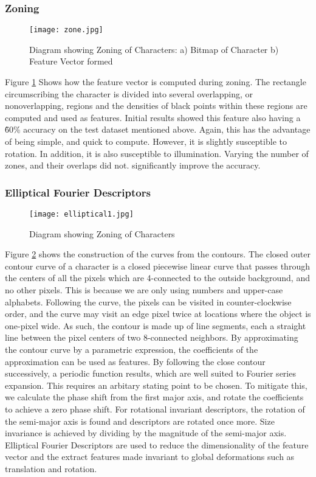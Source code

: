 \subsubsection{Zoning}
\begin{figure}[!]
		\texttt{[image: zone.jpg]}\\
		\caption{Diagram showing Zoning of Characters: a) Bitmap of Character b) Feature Vector formed}
		\label{fig:zone}
\end{figure}
Figure \ref{fig:zone} Shows how the feature vector is computed during zoning. The rectangle circumscribing the character 
is divided into several overlapping, or nonoverlapping, regions and the densities of black points within these regions are computed
and used as features. Initial results showed this feature also having a \~60\% accuracy on the test dataset mentioned above. Again, this has the advantage of being simple, and
quick to compute. However, it is slightly susceptible to rotation.
In addition, it is also susceptible to illumination. Varying the number of zones, and their overlaps did not. significantly improve the accuracy.\\


\subsubsection{Elliptical Fourier Descriptors}
\begin{figure}[h]
		\texttt{[image: elliptical1.jpg]}\\
		\caption{Diagram showing Zoning of Characters}
		\label{fig:elliptical1}
\end{figure}
Figure \ref{fig:elliptical1} shows the construction of the curves from the contours.
The closed outer contour curve of a character is a closed piecewise linear curve that passes through the centers of all the pixels which
are 4-connected to the outside background, and no other pixels. This is because we are only using numbers and upper-case alphabets. Following the
curve, the pixels can be visited in counter-clockwise order, and the curve may visit an edge pixel twice at locations where the object is one-pixel wide.
As such, the contour is made up of line segments, each a straight line between the pixel centers of two 8-connected neighbors. By approximating the
contour curve by a parametric expression, the coefficients of the approximation can be used as features. By following the close contour successively,
a periodic function results, which are well suited to Fourier series expansion. This requires an arbitary stating point to be chosen. To mitigate this,
we calculate the phase shift from the first major axis, and rotate the coefficients to achieve a zero phase shift. For rotational invariant descriptors, the rotation
of the semi-major axis is found and descriptors are rotated once more. Size invariance is achieved by dividing by the magnitude of the semi-major axis.
Elliptical Fourier Descriptors are used to reduce the dimensionality of the feature vector and the extract features made invariant to global deformations
such as translation and rotation.

